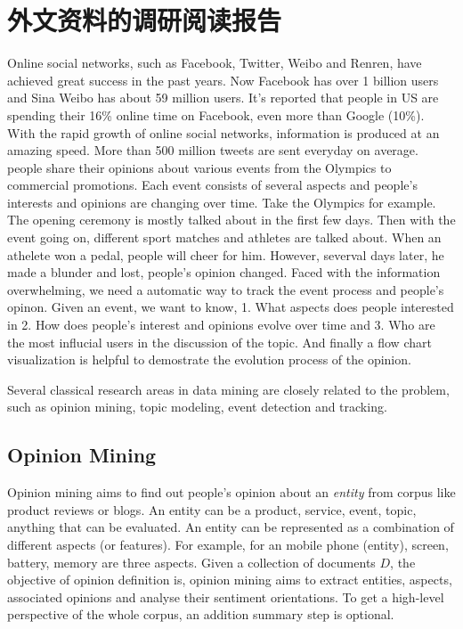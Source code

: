 
\chapter{外文资料的调研阅读报告}
\label{cha:engorg}

Online social networks, such as Facebook, Twitter, Weibo and Renren, have achieved great success in the past years. Now Facebook has over 1 billion users and Sina Weibo has about 59 million users. It's reported that people in US are spending their 16\% online time on Facebook, even more than Google (10\%). With the rapid growth of online social networks, information is produced at an amazing speed. More than 500 million tweets are sent everyday on average. people share their opinions about various events from the Olympics to commercial promotions. Each event consists of several aspects and people's interests and opinions are changing over time. Take the Olympics for example. The opening ceremony is mostly talked about in the first few days. Then with the event going on, different sport matches and athletes are talked about. When an athelete won a pedal, people will cheer for him. However, severval days later, he made a blunder and lost, people's opinion changed. Faced with the information overwhelming, we need a automatic way to track the event process and people's opinon. Given an event, we want to know, 1. What aspects does people interested in 2. How does people's interest and opinions evolve over time and 3. Who are the most influcial users in the discussion of the topic. And finally a flow chart visualization is helpful to demostrate the evolution process of the opinion.

Several classical research areas in data mining are closely related to the problem, such as opinion mining, topic modeling, event detection and tracking. 

\section {Opinion Mining}
Opinion mining aims to find out people's opinion about an {\em entity} from corpus like product reviews or blogs. An entity can be a product, service, event, topic, anything that can be evaluated. An entity can be represented as a combination of different aspects (or features). For example, for an mobile phone (entity), screen, battery, memory are three aspects. Given a collection of documents $D$, the objective of opinion definition is, opinion mining aims to extract entities, aspects, associated opinions and analyse their sentiment orientations. To get a high-level perspective of the whole corpus, an addition summary step is optional.

